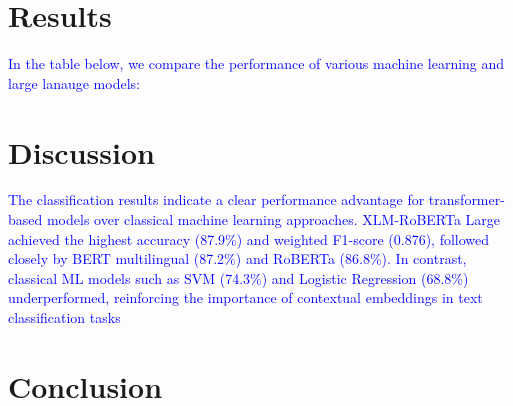 \documentclass[mnsc,nonblindrev]{informs3} %
\begin{document}
\section{Results}

\textcolor{blue}{In the table below, we compare the performance of various machine learning and large lanauge models:}

\begin{table}[h]
\centering
{}
\caption{Classical ML and LLM Performance on 6-digit HS Classification}

\end{table}



\section{Discussion}
\textcolor{blue}{The classification results indicate a clear performance advantage for transformer-based models over classical machine learning approaches. XLM-RoBERTa Large achieved the highest accuracy (87.9\%) and weighted F1-score (0.876), followed closely by BERT multilingual (87.2\%) and RoBERTa (86.8\%). In contrast, classical ML models such as SVM (74.3\%) and Logistic Regression (68.8\%) underperformed, reinforcing the importance of contextual embeddings in text classification tasks}

\section{Conclusion}

%






\end{document}
